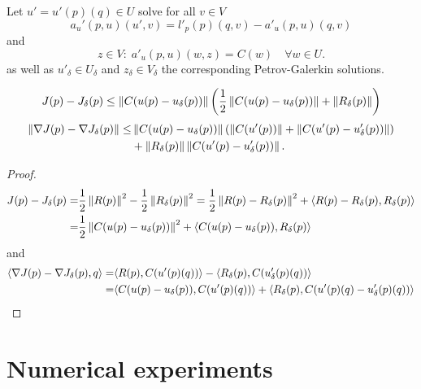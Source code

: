 \documentclass[english,12pt,a4paper]{article}
\begin{document}
Let $u' = u'(p)(q)\in U$ solve for all $v\in V$
%
\begin{equation}\label{eq:gen_tang}
a_u'(p,u)(u', v) = l'_p(p)(q,v) - a'_u(p,u)(q,v)
\end{equation}
%
and
%
\begin{equation}\label{eq:gen_dual}
z\in V:\; a'_u(p,u)(w,z) = C(w)\quad \forall w\in U.
\end{equation}
%
as well as $u'_{\delta}\in U_{\delta}$ and $z_{\delta}\in V_{\delta}$ the corresponding Petrov-Galerkin solutions.
\begin{lemma}\label{lemma:gen_errorinJ}
%
\begin{equation}\label{eq:gen_errorinJ}
J(p) - J_{\delta}(p) \le  \left\|C(u(p)-u_{\delta}(p))\right\|\left( \frac12 \left\|C(u(p)-u_{\delta}(p))\right\| + \left\|R_{\delta}(p)\right\|\right)
\end{equation}
%
\begin{equation}\label{eq:gen_errorinGrad}
%
\begin{aligned}
\norm{\nabla J(p) - \nabla J_{\delta}(p)} \le& \norm{C(u(p)-u_{\delta}(p))}\left( \norm{C(u'(p))} + \norm{C(u'(p)-u'_{\delta}(p))}\right)\\
&+ \norm{R_{\delta}(p)}\norm{C(u'(p)-u'_{\delta}(p))}.
\end{aligned}
%
\end{equation}
%
%
\end{lemma}
%
\begin{proof}
%
\begin{align*}
J(p) - J_{\delta}(p) =&  \frac12 \left\|R(p)\right\|^2 - \frac12 \left\|R_{\delta}(p)\right\|^2 = \frac12 \left\|R(p)-R_{\delta}(p)\right\|^2 + \langle R(p)-R_{\delta}(p),R_{\delta}(p)\rangle\\
=& \frac12 \left\|C(u(p)-u_{\delta}(p))\right\|^2 +  \langle C(u(p)-u_{\delta}(p)),R_{\delta}(p)\rangle
\end{align*}
%
and
%
\begin{align*}
\langle\nabla J(p) - \nabla J_{\delta}(p),q\rangle =& \langle R(p),C(u'(p)(q))\rangle - \langle R_{\delta}(p),C(u_{\delta}'(p)(q))\rangle \\
=& \langle C(u(p)-u_{\delta}(p)),C(u'(p)(q))\rangle + \langle R_{\delta}(p),C(u'(p)(q)-u_{\delta}'(p)(q))\rangle
\end{align*}
%
\end{proof}
%




\cite{Feischl22}

%
\section{Numerical experiments}\label{sec:}
%
%
\end{document}
